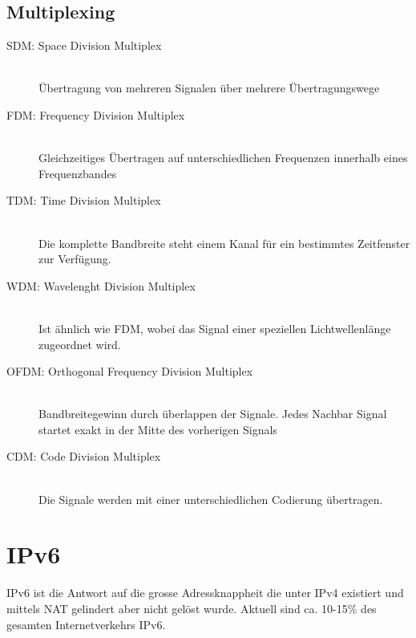\subsection{Multiplexing}
\begin{description}
	\item[SDM: Space Division Multiplex] \hfill \\
	Übertragung von mehreren Signalen über mehrere Übertragungswege
	\item[FDM: Frequency Division Multiplex] \hfill \\
	Gleichzeitiges Übertragen auf unterschiedlichen Frequenzen innerhalb eines Frequenzbandes
	\item[TDM: Time Division Multiplex] \hfill \\
	Die komplette Bandbreite steht einem Kanal für ein bestimmtes Zeitfenster zur Verfügung.
	\item[WDM: Wavelenght Division Multiplex] \hfill \\
	Ist ähnlich wie FDM, wobei das Signal einer speziellen Lichtwellenlänge zugeordnet wird.
	\item[OFDM: Orthogonal Frequency Division Multiplex] \hfill \\
	Bandbreitegewinn durch überlappen der Signale. Jedes Nachbar Signal startet exakt in der Mitte des vorherigen Signals
	\item[CDM: Code Division Multiplex] \hfill \\
	Die Signale werden mit einer unterschiedlichen Codierung übertragen.
\end{description}

	
\section{IPv6}
IPv6 ist die Antwort auf die grosse Adressknappheit die unter IPv4 existiert und mittels NAT gelindert aber nicht gelöst wurde. Aktuell sind ca. 10-15\% des gesamten Internetverkehrs IPv6. 


